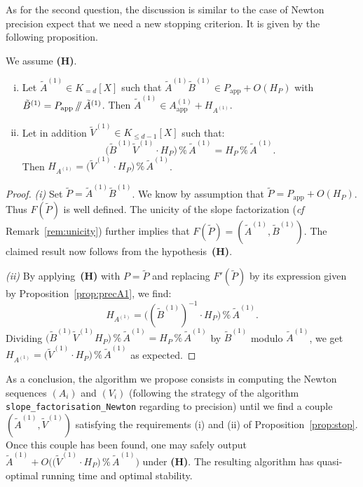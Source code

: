 \documentclass{sig-alternate-05-2015}
\renewcommand{\mod}{\,\%\,}
\renewcommand{\div}{\,/\hspace{-0.3em}/\,}
\newcommand{\app}{\textrm{app}}
\begin{document}
As for the second question, the discussion is similar to the case of 
Newton precision expect that we need a new stopping criterion. It is given 
by the following proposition.

\begin{prop}
\label{prop:stop}
We assume \textbf{(H)}. 

\vspace{-1mm}

\begin{enumerate}[(i)]
\item Let $\tilde A^{(1)} \in K_{=d}[X]$ such that
$\tilde A^{(1)} \tilde B^{(1)} \in P_\app + O(H_P)$ with
$\tilde B^{(1)} = P_\app \div \tilde A^{(1)}$.
Then $\tilde A^{(1)} \in A_\app^{(1)} + H_{A^{(1)}}$.
\vspace{-1mm}
\item Let in addition $\tilde V^{(1)} \in K_{\leq d{-}1}[X]$ such that:
$$\big(\tilde B^{(1)} \tilde V^{(1)} \cdot H_P\big) \mod \tilde A^{(1)}
= H_P \mod \tilde A^{(1)}.$$
Then $H_{A^{(1)}} = \big(\tilde V^{(1)} \cdot H_P\big) \mod \tilde A^{(1)}$.
\end{enumerate}
\end{prop}

\begin{proof}
\emph{(i)} 
Set $\tilde P = \tilde A^{(1)} \tilde B^{(1)}$. We know by assumption
that $\tilde P = P_\app + O(H_P)$. Thus $F(\tilde P)$ is well defined.
The unicity of the slope factorization (\emph{cf} 
Remark~\ref{rem:unicity}) further implies that $F(\tilde P) = 
(\tilde A^{(1)}, \tilde B^{(1)})$. The claimed result now follows from
the hypothesis~\textbf{(H)}.

\emph{(ii)} By applying~\textbf{(H)} with $P = \tilde P$ and replacing 
$F'(\tilde P)$ by its expression given by Proposition~\ref{prop:precA1}, 
we find:
$$H_{A^{(1)}} = \big((\tilde B^{(1)})^{-1} \cdot H_P\big) \mod \tilde A^{(1)}.$$
Dividing $\big(\tilde B^{(1)} \tilde V^{(1)} H_P\big) \mod \tilde 
A^{(1)} = H_P \mod \tilde A^{(1)}$ by $\tilde B^{(1)}$ modulo $\tilde
A^{(1)}$, we get
$H_{A^{(1)}} = \big(\tilde V^{(1)} \cdot H_P\big) \mod \tilde A^{(1)}$
as expected.
\end{proof}

As a conclusion, the algorithm we propose consists in computing the 
Newton sequences $(A_i)$ and $(V_i)$ (following the strategy of the
algorithm \texttt{slope\_factorisation\_Newton} regarding to precision)
until we find a couple $(\tilde A^{(1)}, \tilde V^{(1)})$ satisfying 
the requirements (i) and (ii) of Proposition~\ref{prop:stop}. Once this 
couple has been found, one may safely output $\tilde A^{(1)} + 
O\big(\big(\tilde V^{(1)} \cdot H_P\big) \mod \tilde A^{(1)}\big)$ under
\textbf{(H)}.
The resulting algorithm has quasi-optimal running 
time and optimal stability.
\end{document}
